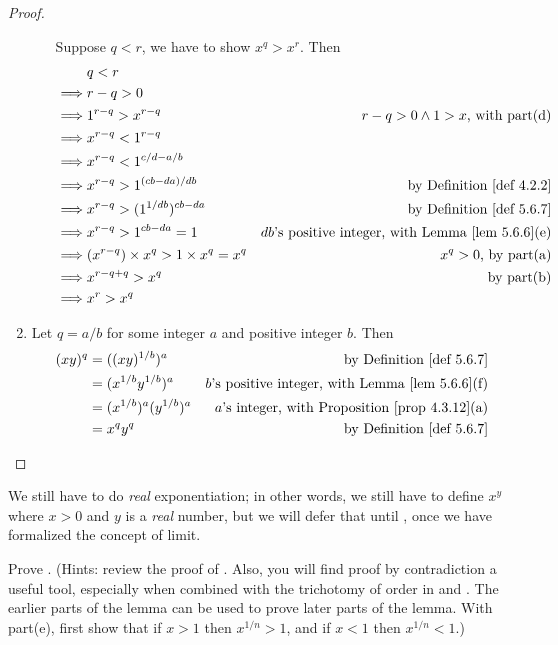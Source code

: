 \begin{proof}
\begin{enumerate}
\begin{itemize}
        Suppose \(q < r\), we have to show \(x^q > x^r\).
        Then
        \begin{align*}
                     & q < r \\
            \implies & r - q > 0 \\
            \implies & 1^{r - q} > x^{r - q} & \text{\(r - q > 0 \land 1 > x\), with part(d)} \\
            \implies & x^{r - q} < 1^{r - q} \\
            \implies & x^{r - q} < 1^{c/d - a/b} \\
            \implies & x^{r - q} > 1^{(cb - da)/db} & \text{by \DEF{4.2.2}} \\
            \implies & x^{r - q} > (1^{1/db})^{cb - da} & \text{by \DEF{5.6.7}} \\
            \implies & x^{r - q} > 1^{cb - da} = 1 & \text{\(db\)'s positive integer, with \LEM{5.6.6}(e)} \\
            \implies & (x^{r - q}) \X x^q > 1 \X x^q = x^q & \text{\(x^q > 0\), by part(a)} \\
            \implies & x^{r - q + q} > x^q & \text{by part(b)} \\
            \implies & x^r > x^q
        \end{align*}
    \end{itemize}
\item
    Let \(q = a/b\) for some integer \(a\) and positive integer \(b\).
    Then
    \begin{align*}
        (xy)^{q} & = ((xy)^{1/b})^a & \text{by \DEF{5.6.7}} \\
                 & = (x^{1/b} y^{1/b})^a & \text{\(b\)'s positive integer, with \LEM{5.6.6}(f)} \\
                 & = (x^{1/b})^a (y^{1/b})^a & \text{\(a\)'s integer, with \PROP{4.3.12}(a)} \\
                 & = x^q y^q & \text{by \DEF{5.6.7}}
    \end{align*}
\end{enumerate}
\end{proof}

We still have to do \emph{real} exponentiation;
in other words, we still have to define \(x^y\) where \(x > 0\) and \(y\) is a \emph{real} number,
but we will defer that until , once we have formalized the concept of limit.

\exercisesection

\begin{exercise} \label{exercise 5.6.1}
Prove .
(Hints: review the proof of .
Also, you will find proof by contradiction a useful tool, especially when combined with the trichotomy of order in  and .
The earlier parts of the lemma can be used to prove later parts of the lemma.
With part(e), first show that if \(x > 1\) then \(x^{1/n} > 1\), and if \(x < 1\) then \(x^{1/n} < 1\).)
\end{exercise}

